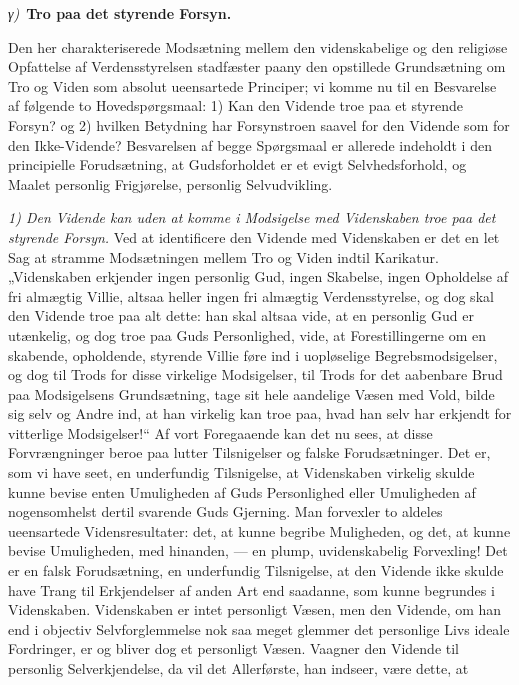 \documentclass[12pt]{book}
\newcommand{\greekrun}[2]{%
  \medskip\begin{center}{\itshape #1)}\ {\bfseries #2}\end{center}\medskip}
\begin{document}
\greekrun{γ}{Tro paa det styrende Forsyn.}

Den her charakteriserede Modsætning mellem den videnskabelige og den
religiøse Opfattelse af Verdensstyrelsen stadfæster paany den
opstillede Grundsætning om Tro og Viden som absolut ueensartede
Principer; vi komme nu til en Besvarelse af følgende to
Hovedspørgsmaal: 1) Kan den Vidende troe paa et styrende Forsyn? og
2) hvilken Betydning har Forsynstroen saavel for den Vidende som for
den Ikke-Vidende? Besvarelsen af begge Spørgsmaal er allerede
indeholdt i den principielle Forudsætning, at Gudsforholdet er et
evigt Selvhedsforhold, og Maalet personlig Frigjørelse, personlig
Selvudvikling.

\emph{1) Den Vidende kan uden at komme i Modsigelse med Videnskaben
troe paa det styrende Forsyn.} Ved at identificere den Vidende med
Videnskaben er det en let Sag at stramme Modsætningen mellem Tro og
Viden indtil Karikatur. „Videnskaben erkjender ingen personlig Gud,
ingen Skabelse, ingen Opholdelse af fri almægtig Villie, altsaa
heller ingen fri almægtig Verdensstyrelse, og dog skal den Vidende
troe paa alt dette: han skal altsaa vide, at en personlig Gud er
utænkelig, og dog troe paa Guds Personlighed, vide, at
Forestillingerne om en skabende, opholdende, styrende Villie føre
ind i uopløselige Begrebsmodsigelser, og dog til Trods for disse
virkelige Modsigelser, til Trods for det aabenbare
Brud paa Modsigelsens Grundsætning, tage sit hele aandelige Væsen
med Vold, bilde sig selv og Andre ind, at han virkelig kan troe paa,
hvad han selv har erkjendt for vitterlige Modsigelser!“ Af vort
Foregaaende kan det nu sees, at disse Forvrængninger beroe paa
lutter Tilsnigelser og falske Forudsætninger. Det er, som vi have
seet, en underfundig Tilsnigelse, at Videnskaben virkelig skulde
kunne bevise enten Umuligheden af Guds Personlighed eller
Umuligheden af nogensomhelst dertil svarende Guds Gjerning. Man
forvexler to aldeles ueensartede Vidensresultater: det, at kunne
begribe Muligheden, og det, at kunne bevise Umuligheden, med
hinanden, --- en plump, uvidenskabelig Forvexling! Det er en falsk
Forudsætning, en underfundig Tilsnigelse, at den Vidende ikke skulde
have Trang til Erkjendelser af anden Art end saadanne, som kunne
begrundes i Videnskaben. Videnskaben er intet personligt Væsen, men
den Vidende, om han end i objectiv Selvforglemmelse nok saa meget
glemmer det personlige Livs ideale Fordringer, er og bliver dog et
personligt Væsen. Vaagner den Vidende til personlig
Selverkjendelse, da vil det Allerførste, han indseer, være dette, at
\end{document}
